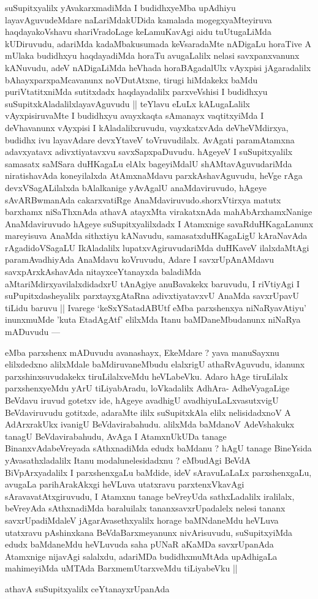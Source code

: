 \begin{artha}
suSupitxyalilx yAvakarxmadiMda I budidhxyeMba upAdhiyu
layavAguvudeMdare naLariMdakUDida kamalada mogegxyaMteyiruva
haqdayakoVshavu shariVradoLage keLamuKavAgi aidu tuUtugaLiMda
kUDiruvudu, adariMda kadaMbakusumada keVsaradaMte nADigaLu horaTive A
mUlaka budidhxyu haqdayadiMda horaTu avugaLalilx nelasi savxpanxvanunx
kANuvudu, adeV nADigaLiMda heVhada horaBAgadalUlx vAyxpisi
jAgaradalilx bAhayxparxpaMcavanunx noVDutAtxne, tirugi hiMdakekx baMdu
puriVtatitxniMda sutitxdadx haqdayadalilx parxveVshisi I budidhxyu
suSupitxkAladalilxlayavAguvudu || teYlavu eLuLx kALugaLalilx
vAyxpisiruvaMte I budidhxyu avayxkaqta sAmanayx vaqtitxyiMda I
deVhavanunx vAyxpisi I kAladalilxruvudu, vayxkatxvAda deVheVMdirxya,
budidhx ivu layavAdare devxYtaveV toVruvudilalx. AvAgati paramAtamxna
adavxyatavx adivxtiyatavxvu savxSapxpaDuvudu. hAgeyeV I suSupitxyalilx
samasatx saMSara duHKagaLu elAlx bageyiMdalU shAMtavAguvudariMda
niratishavAda koneyilalxda AtAmxnaMdavu parxkAshavAguvudu, heVge rAga
devxVSagALilalxda bAlalkanige yAvAgalU  anaMdaviruvudo, hAgeye
sAvARBwmanAda cakarxvatiRge AnaMdaviruvudo.shorxVtirxya  matutx
barxhamx niSaThxnAda athavA atayxMta virakatxnAda 
mahAbArxhamxNanige AnaMdaviruvudo hAgeye suSupitxyalilxdadx I
Atamxnige savaRduHKagaLanunx mareyisuva AnaMda sithxtiyu kANavudu,
samasatxduHKagaLigU kAraNavAda rAgadidoVSagaLU IkAladalilx
lupatxvAgiruvudariMda duHKaveV ilalxdaMtAgi paramAvadhiyAda AnaMdavu
koVruvudu, Adare I savxrUpAnAMdavu savxpArxkAshavAda nitayxceYtanayxda
baladiMda aMtariMdirxyavilalxdidadxrU tAnAgiye anuBavakekx baruvudu, I
riVtiyAgi I suPupitxdasheyalilx parxtayxgAtaRna adivxtiyatavxvU AnaMda
savxrUpavU tiLidu baruvu || Ivarege `keSxYSatadABUtf eMba parxshenxya
niNaRyavAtiyu' inunxmuMde 'kuta EtadAgAtf' elilxMda Itanu
baMDaneMbudanunx niNaRya mADuvudu ---
\end{artha}


\begin{artha}
eMba parxshenx mADuvudu avanashayx, EkeMdare ? yava manuSayxnu
elilxdedxno alilxMdale baMdiruvaneMbudu elalxrigU athaRvAguvudu,
idanunx parxshinxsuvudakekx tiruLilalxveMdu heVLabeVku. Adaro hAge
tiruLilalx parxshenxyeMdu yArU tiLiyabAradu, loVkadalilx AdhAra-
AdheVyagaLige BeVdavu iruvud gotetxv ide, hAgeye avadhigU
avadhiyuLaLxvasutxvigU BeVdaviruvudu gotitxde, adaraMte ililx suSupitxkAla
elilx nelisidadxnoV A AdArxrakUkx ivanigU BeVdavirabahudu. alilxMda
baMdanoV AdeVshakukx tanagU BeVdavirabahudu, AvAga  I AtamxnUkUDa
tanage BinanxvAdabeVreyada sAthxnadiMda edudx baMdanu ? hAgU tanage
BineYsida yAvasathxladalilx Itanu modalunelesidadxnu ? eMbudAgi BeVdA
BiVpArxyadalilx I parxshenxgaLu baMdide, ideV sAravuLaLaLx
parxshenxgaLu, avugaLa parihArakAkxgi heVLuva utatxravu
parxtenxVkavAgi sAravavatAtxgiruvudu, I Atamxnu tanage beVreyUda
sathxLadalilx iralilalx, beVreyAda sAthxnadiMda baraluilalx
tananxsavxrUpadalelx nelesi tananx savxrUpadiMdaleV
jAgarAvasethxyalilx horage baMNdaneMdu heVLuva utatxravu pAshinxkana
BeVdaBarxmeyanunx nivArisuvudu, suSupitxyiMda edudx baMdaneMdu
heVLuvuda saha pUNaR aKaMDa savxrUpanAda Atamxnige nijavAgi salalxdu,
adariMDa budidhxmuMtAda upAdhigaLa mahimeyiMda uMTAda
BarxmemUtarxveMdu tiLiyabeVku ||
\end{artha}

\begin{artha}
athavA suSupitxyalilx ceYtanayxrUpanAda 
\end{artha}
\begin{shl}

\end{shl}
